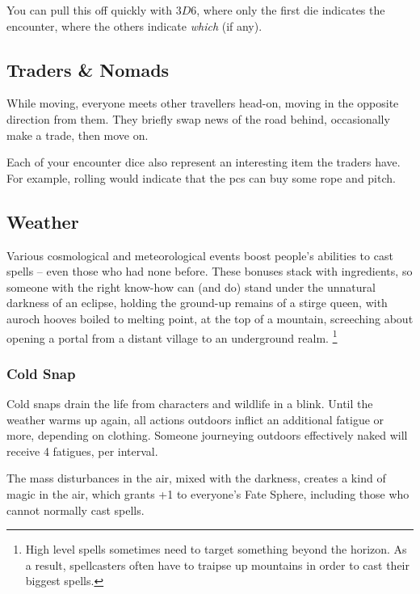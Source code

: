 \begin{multicols}{2}
You can pull this off quickly with $3D6$, where only the first die indicates the encounter, where the others indicate \emph{which} (if any).

\subsection{Traders \& Nomads}

While moving, everyone meets other travellers head-on, moving in the opposite direction from them.
They briefly swap news of the road behind, occasionally make a trade, then move on.

\encTraders

Each of your encounter dice also represent an interesting item the traders have.
For example, rolling  would indicate that the \glspl{pc} can buy some rope and pitch.

\subsection{Weather}
\label{weather}
Various cosmological and meteorological events boost people's abilities to cast spells -- even those who had none before.
These bonuses stack with \glspl{ingredient}, so someone with the right know-how can (and do) stand under the unnatural darkness of an eclipse, holding the ground-up remains of a stirge queen, with auroch hooves boiled to melting point, at the top of a mountain, screeching about opening a portal from a distant \gls{village} to an underground realm.%
\footnote{High level spells sometimes need to target something beyond the horizon.
As a result, spellcasters often have to traipse up mountains in order to cast their biggest spells.}

\subsubsection{Cold Snap}

Cold snaps drain the life from characters and wildlife in a blink.
Until the weather warms up again, all actions outdoors inflict an additional \gls{fatigue} or more, depending on clothing.
Someone journeying outdoors effectively naked will receive 4 \glspl{fatigue}, per \gls{interval}.

The mass disturbances in the air, mixed with the darkness, creates a kind of magic in the air, which grants +1 to everyone's Fate Sphere, including those who cannot normally cast spells.


\end{multicols}

